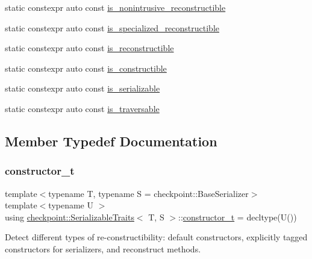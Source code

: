 \begin{DoxyCompactItemize}
static constexpr auto const \hyperlink{structcheckpoint_1_1_serializable_traits_a35d5afbe97197885a1513765a210837c}{is\+\_\+nonintrusive\+\_\+reconstructible}
\item 
static constexpr auto const \hyperlink{structcheckpoint_1_1_serializable_traits_a305317a4e8fb44498f195a39bf59ad2d}{is\+\_\+specialized\+\_\+reconstructible}
\item 
static constexpr auto const \hyperlink{structcheckpoint_1_1_serializable_traits_a6cc78a7cc9b4645727c92437619fce83}{is\+\_\+reconstructible}
\item 
static constexpr auto const \hyperlink{structcheckpoint_1_1_serializable_traits_a7720e2f57d1b3d2f87fd022b47d0b775}{is\+\_\+constructible}
\item 
static constexpr auto const \hyperlink{structcheckpoint_1_1_serializable_traits_a3941c4fcb5397fe564a3453857aa9183}{is\+\_\+serializable}
\item 
static constexpr auto const \hyperlink{structcheckpoint_1_1_serializable_traits_a426639501cd0ce23cb14c7b2ff982fc1}{is\+\_\+traversable}
\end{DoxyCompactItemize}


\subsection{Member Typedef Documentation}
\mbox{\label{structcheckpoint_1_1_serializable_traits_aa0430155930461d346b90681db234d84}} 
\subsubsection{\texorpdfstring{constructor\+\_\+t}{constructor\_t}}
{\footnotesize\ttfamily template$<$typename T, typename S = checkpoint\+::\+Base\+Serializer$>$ \\
template$<$typename U $>$ \\
using \hyperlink{structcheckpoint_1_1_serializable_traits}{checkpoint\+::\+Serializable\+Traits}$<$ T, S $>$\+::\hyperlink{structcheckpoint_1_1_serializable_traits_aa0430155930461d346b90681db234d84}{constructor\+\_\+t} =  decltype(U())}

Detect different types of re-\/constructibility\+: default constructors, explicitly tagged constructors for serializers, and reconstruct methods. \mbox{\label{structcheckpoint_1_1_serializable_traits_a8e42305be1264b105f525ae7dff36c15}} 
